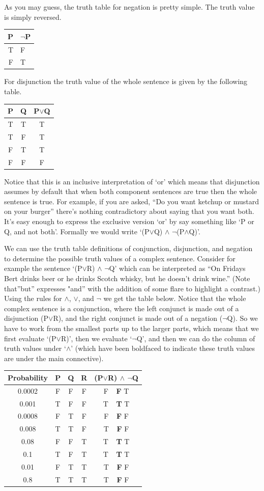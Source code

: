 \documentclass[]{tufte-book}
\begin{document}
As you may guess, the truth table for negation is pretty simple. The truth value is simply reversed.

\begin{longtable}[]{@{}rl@{}}
\toprule
P & \(\neg\)P\tabularnewline
\midrule
\endhead
T & F\tabularnewline
F & T\tabularnewline
\bottomrule
\end{longtable}

For disjunction the truth value of the whole sentence is given by the following table.

\begin{longtable}[]{@{}ccc@{}}
\toprule
P & Q & P\(\vee\)Q\tabularnewline
\midrule
\endhead
T & T & T\tabularnewline
T & F & T\tabularnewline
F & T & T\tabularnewline
F & F & F\tabularnewline
\bottomrule
\end{longtable}

Notice that this is an inclusive interpretation of `or' which means that disjunction assumes by default that when both component sentences are true then the whole sentence is true. For example, if you are asked, ``Do you want ketchup or mustard on your burger'' there's nothing contradictory about saying that you want both. It's easy enough to express the exclusive version `or' by say something like `P or Q, and not both'. Formally we would write `(P\(\vee\)Q) \(\wedge\) \(\neg\)(P\(\wedge\)Q)'.

We can use the truth table definitions of conjunction, disjunction, and negation to determine the possible truth values of a complex sentence. Consider for example the sentence `(P\(\vee\)R) \(\wedge\) \(\neg\)Q' which can be interpreted as ``On Fridays Bert drinks beer or he drinks Scotch whisky, but he doesn't drink wine.'' (Note that''but'' expresses "and'' with the addition of some flare to highlight a contrast.) Using the rules for \(\wedge\), \(\vee\), and \(\neg\) we get the table below. Notice that the whole complex sentence is a conjunction, where the left conjunct is made out of a disjunction (P\(\vee\)R), and the right conjunct is made out of a negation (\(\neg\)Q). So we have to work from the smallest parts up to the larger parts, which means that we first evaluate `(P\(\vee\)R)', then we evaluate `\(\neg\)Q', and then we can do the column of truth values under `\(\wedge\)' (which have been boldfaced to indicate these truth values are under the main connective).

\begin{longtable}[]{@{}ccccc@{}}
\toprule
Probability & P & Q & R & (P\(\vee\)R) \(\wedge\) \(\neg\)Q\tabularnewline
\midrule
\endhead
0.0002 & F & F & F & F \(~~\) \textbf{F} T\tabularnewline
0.001 & T & F & F & T \(~~\) \textbf{T} T\tabularnewline
0.0008 & F & T & F & F \(~~\) \textbf{F} F\tabularnewline
0.008 & T & T & F & T \(~~\) \textbf{F} F\tabularnewline
0.08 & F & F & T & T \(~~\) \textbf{T} T\tabularnewline
0.1 & T & F & T & T \(~~\) \textbf{T} T\tabularnewline
0.01 & F & T & T & T \(~~\) \textbf{F} F\tabularnewline
0.8 & T & T & T & T \(~~\) \textbf{F} F\tabularnewline
\bottomrule
\end{longtable}
\end{document}
